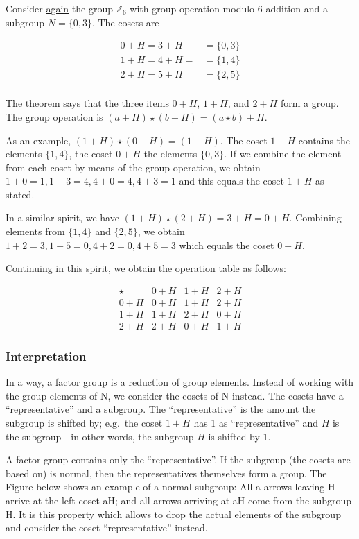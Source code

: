 Consider \href{\%7Bfilename\%7D2016-03-25-groups_05.markdown}{again} the
group \(\mathbb{Z}_6\) with group operation modulo-6 addition and a
subgroup \(N=\{0,3\}\). The cosets are


\begin{align*}
0 + H = 3 + H &= \{0,3\} \\
1 + H = 4 + H = &= \{1,4\} \\
2 + H = 5 + H &= \{2,5\} \\
\end{align*}


The theorem says that the three items \(0 + H\), \(1 + H\), and
\(2 + H\) form a group. The group operation is
\((a + H) \star (b + H) = (a \star b) + H\).

As an example, \((1+H) \star (0+H) = (1+H)\). The coset \(1+H\) contains
the elements \(\{1,4\}\), the coset \(0+H\) the elements \(\{0,3\}\). If
we combine the element from each coset by means of the group operation,
we obtain \(1+0=1, 1+3=4, 4+0=4, 4+3=1\) and this equals the coset
\(1+H\) as stated.

In a similar spirit, we have \((1+H)\star(2+H)=3+H=0+H\). Combining
elements from \(\{1,4\}\) and \(\{2,5\}\), we obtain
\(1+2=3, 1+5=0, 4+2=0, 4+5=3\) which equals the coset \(0+H\).

Continuing in this spirit, we obtain the operation table as follows:

\[
\begin{array}{c|ccc}
\star & 0+H & 1+H & 2+H \\ \hline
0+H   & 0+H & 1+H & 2+H \\
1+H   & 1+H & 2+H & 0+H \\
2+H   & 2+H & 0+H & 1+H
\end{array}
\]

\subsubsection{Interpretation}\label{interpretation}

In a way, a factor group is a reduction of group elements. Instead of
working with the group elements of N, we consider the cosets of N
instead. The cosets have a ``representative'' and a subgroup. The
``representative'' is the amount the subgroup is shifted by; e.g.~the
coset \(1 + H\) has 1 as ``representative'' and \(H\) is the subgroup -
in other words, the subgroup \(H\) is shifted by 1.

A factor group contains only the ``representative''. If the subgroup
(the cosets are based on) is normal, then the representatives themselves
form a group. The Figure below shows an example of a normal subgroup:
All a-arrows leaving H arrive at the left coset aH; and all arrows
arriving at aH come from the subgroup H. It is this property which
allows to drop the actual elements of the subgroup and consider the
coset ``representative'' instead.

